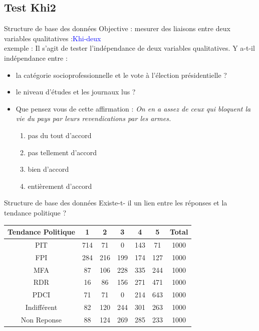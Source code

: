 \documentclass[10pt]{beamer}
\begin{document}
\subsection{Test Khi2}
\begin{frame}{Structure de base des données}
Objective : mesurer des liaisons entre deux variables qualitatives :\textcolor{blue}{Khi-deux}\\
exemple : 
Il s’agit de tester l’indépendance de deux variables qualitatives.
Y a-t-il indépendance entre :


\begin{itemize}
\item la catégorie socioprofessionnelle et le vote à l'élection
présidentielle ?
\item  le niveau d’études et les journaux lus ?

\item Que pensez vous de cette affirmation : \textit{On en a assez de ceux qui bloquent la vie du pays par leurs revendications par les armes.}

\begin{enumerate}
\item  pas du tout d'accord
\item pas tellement d'accord 
\item bien d'accord 
\item entièrement d'accord
\end{enumerate}
\end{itemize}

 
\end{frame}

\begin{frame}{Structure de base des données}
\centering
Existe-t- il un lien entre les réponses et la tendance politique ?   
\begin{table}
\begin{tabular}{|c|c|c|c|c|c|c|}
\hline 
Tendance Politique & 1 & 2 & 3 & 4 & 5 & Total \\ 
\hline 
PIT & 714 & 71 & 0 & 143 & 71 & 1000 \\ 
\hline 
FPI & 284 & 216 & 199 & 174 & 127 & 1000 \\ 
\hline 
MFA & 87 & 106 & 228 & 335 & 244 & 1000 \\ 
\hline 
RDR & 16 & 86 & 156 & 271 & 471 & 1000 \\ 
\hline 
PDCI & 71 & 71 & 0 & 214 & 643 & 1000 \\ 
\hline 
Indifférent & 82 & 120 & 244 & 301 & 263 & 1000 \\ 
\hline 
Non Reponse & 88 & 124 & 269 & 285 & 233 & 1000 \\ 
\hline 
\end{tabular} 
\end{table}

 
\end{frame}
\end{document}
